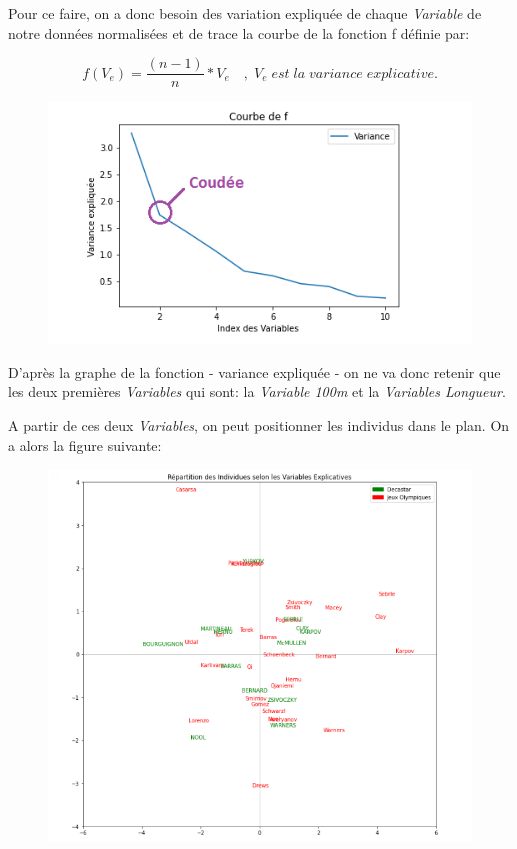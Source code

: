 \documentclass{article}
\begin{document}
Pour ce faire, on a donc besoin des variation expliquée de chaque \textit{Variable} de notre données normalisées et de trace la courbe de la fonction f définie par:

\begin{equation*}
f(V_e)=\frac{(n-1)}{n}*V_e \quad , \; V_e \; est \; la  \; variance \; explicative.
\end{equation*}

\begin{figure}[h!]
\includegraphics[width=\linewidth]{images/courbe_ve.png}
\end{figure}

D'après la graphe de la fonction - variance expliquée - on ne va donc retenir que les deux premières \textit{Variables} qui sont: la \textit{Variable 100m} et la \textit{Variables Longueur}.
\newline

\newpage

A partir de ces deux \textit{Variables}, on peut positionner les individus dans le plan. On a alors la figure suivante:

\begin{figure}[h!]
\includegraphics[width=\linewidth]{images/graph-plan.png}
\end{figure}
\end{document}
